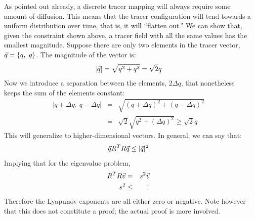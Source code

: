 \documentclass{article}
\begin{document}
As pointed out already, a discrete tracer mapping will always require some 
amount of diffusion.  This means that the tracer configuration will 
tend towards a uniform distribution over time, 
that is, it will ``flatten out.''  We can
show that, given the constraint shown above, 
a tracer field with all the same values has the smallest magnitude.  
Suppose there are only two elements in the 
tracer vector, $\vec q=\lbrace q,~q \rbrace$.  The magnitude of the vector is:
\begin{equation}
|\vec q|=\sqrt{q^2+q^2}=\sqrt{2} q
\end{equation}
Now we introduce a separation between the elements, $2\Delta q$, that 
nonetheless keeps the sum of the elements constant:
\begin{eqnarray}
|q+\Delta q,~q-\Delta q| & = & \sqrt{(q+\Delta q)^2+(q-\Delta q)^2} \\
& = & \sqrt{2}\sqrt{q^2+(\Delta q)^2} \ge \sqrt{2} q
\end{eqnarray}
This will generalize to higher-dimensional vectors.  In general, we can
say that:
\begin{equation}
\vec q R^T R \vec q \le | \vec q |^2
\label{tracer_map_inequality}
\end{equation}
Implying that for the eigenvalue problem,
\begin{eqnarray}
R^T R \vec v & = & s^2 \vec v \nonumber\\
s^2 & \le & 1 \label{SV_inequality}
\end{eqnarray}
Therefore the Lyapunov exponents are all
either zero or negative.
Note however that this does not constitute a proof; the actual proof is more 
involved.
\end{document}
